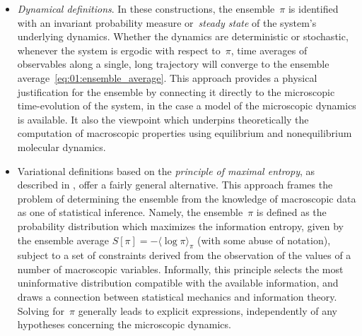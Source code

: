 \begin{itemize}
    \item{\textit{Dynamical definitions}. In these constructions, the ensemble~$\pi$ is identified with an invariant probability measure or~\textit{steady state} of the system's underlying dynamics.
    Whether the dynamics are deterministic or stochastic, whenever the system is ergodic with respect to~$\pi$, time averages of observables along a single, long trajectory will converge to the ensemble average~\eqref{eq:01:ensemble_average}.
    This approach provides a physical justification for the ensemble by connecting it directly to the microscopic time-evolution of the system, in the case a model of the microscopic dynamics is available.
    It also the viewpoint which underpins theoretically the computation of macroscopic properties using equilibrium and nonequilibrium molecular dynamics.
    }
    \item{Variational definitions based on the \textit{principle of maximal entropy}, as described in \cite{J57a,J57b}, offer a fairly general alternative.
    This approach frames the problem of determining the ensemble from the knowledge of macroscopic data as one of statistical inference.
    Namely, the ensemble~$\pi$ is defined as the probability distribution which maximizes the information entropy, given by the ensemble average $S[\pi] = -\langle\log\pi\rangle_\pi$ (with some abuse of notation), subject to a set of constraints derived from the observation of the values of a number of macroscopic variables.
    Informally, this principle selects the most uninformative distribution compatible with the available information, and draws a connection between statistical mechanics and information theory. Solving for~$\pi$ generally leads to explicit expressions, independently of any hypotheses concerning the microscopic dynamics.}
\end{itemize}

